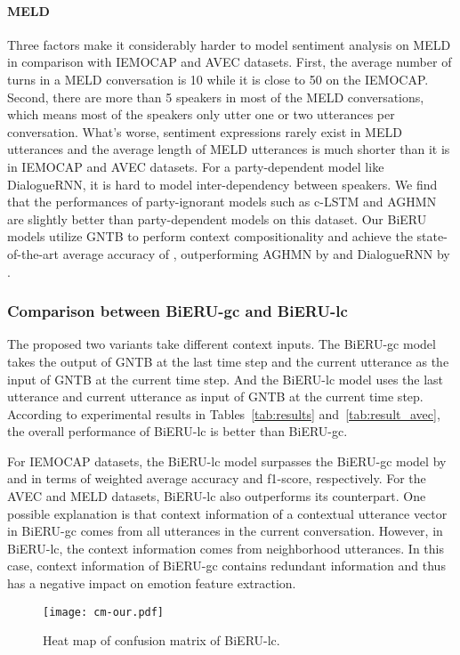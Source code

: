 \documentclass[journal]{IEEEtran}
\begin{document}
\paragraph{MELD}
Three factors make it considerably harder to model sentiment analysis on MELD in comparison with IEMOCAP and AVEC datasets. First, the average number of turns in a MELD conversation is 10 while it is close to 50 on the IEMOCAP. Second, there are more than 5 speakers in most of the MELD conversations, which means most of the speakers only utter one or two utterances per conversation. What's worse, sentiment expressions rarely exist in MELD utterances and the average length of MELD utterances is much shorter than it is in IEMOCAP and AVEC datasets. For a party-dependent model like DialogueRNN, it is hard to model inter-dependency between speakers. We find that the performances of party-ignorant models such as c-LSTM and AGHMN are slightly better than party-dependent models on this dataset. Our BiERU models utilize GNTB to perform context compositionality and achieve the state-of-the-art average accuracy of , outperforming AGHMN by  and DialogueRNN by .

\subsubsection{Comparison between BiERU-gc and BiERU-lc}
The proposed two variants take different context inputs. The BiERU-gc model takes the output of GNTB at the last time step and the current utterance as the input of GNTB at the current time step. And the BiERU-lc model uses the last utterance and current utterance as input of GNTB at the current time step. According to experimental results in Tables~\ref{tab:results} and~\ref{tab:result_avec}, the overall performance of BiERU-lc is better than BiERU-gc.

For IEMOCAP datasets, the BiERU-lc model surpasses the BiERU-gc model by  and  in terms of weighted average accuracy and f1-score, respectively. For the AVEC and MELD datasets, BiERU-lc also outperforms its counterpart. One possible explanation is that context information of a contextual utterance vector in BiERU-gc comes from all utterances in the current conversation. However, in BiERU-lc, the context information comes from neighborhood utterances. In this case, context information of BiERU-gc contains redundant information and thus has a negative impact on emotion feature extraction.

\begin{figure}[!ht]
    \centering
	\texttt{[image: cm-our.pdf]}
	\linespread{1}
    \caption{Heat map of confusion matrix of BiERU-lc.}
\label{fig:heatmap}
\end{figure}{}
\end{document}
